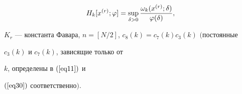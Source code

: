 \begin{thm}
\begin{gather}
%


H_k[x^{(r)};\varphi]=\sup_{\delta>0}


\frac{\omega_k(x^{(r)};\delta)}{\varphi(\delta)},\notag


\end{gather}


$K_r$ --- константа Фавара, $n=[N/2]$, $c_8(k) =


c_7(k)c_3(k)$ $($постоянные


$c_3(k)$ и $c_7(k)$, зависящие только от


$k$, определены в $(\ref{eq11})$ и


$(\ref{eq30})$ соответственно$)$.


\end{thm}





